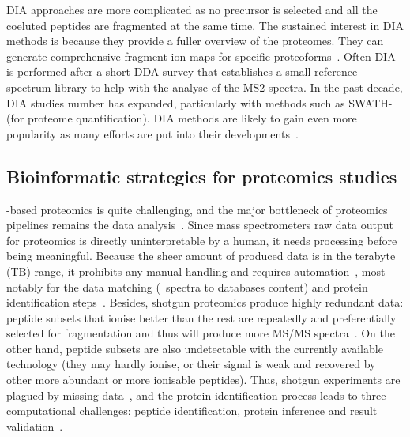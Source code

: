 \gls{DIA} approaches are more complicated
as no precursor is selected and
all the coeluted peptides are fragmented at the same time.
The sustained interest in \gls{DIA} methods is because
they provide a fuller overview of the proteomes.
They can generate comprehensive fragment-ion maps for
specific proteoforms~.
Often \gls{DIA} is performed after a short \gls{DDA} survey
that establishes a small reference spectrum library
to help with the analyse of the MS2 spectra.
In the past decade, \gls{DIA} studies number has expanded,
particularly with methods such as SWATH-\ms~
(for proteome quantification).
\gls{DIA} methods are likely to gain even more popularity
as many efforts are put into their developments~.

\subsection{Bioinformatic strategies for proteomics studies}

\ms-based proteomics is quite challenging,
and the major bottleneck of proteomics pipelines remains
the data analysis~.
Since mass spectrometers raw data output
for proteomics is directly uninterpretable by a human,
it needs processing before being meaningful.
Because the sheer amount of produced data is in the terabyte (\gls{TB}) range,
it prohibits any manual handling and requires automation~,
most notably for the data matching (\ms\ spectra to databases content) and
protein identification steps~.
Besides, shotgun proteomics produce highly redundant data:
peptide subsets that ionise better than the rest
are repeatedly and preferentially selected for fragmentation
and thus will produce more \gls{MS/MS} spectra~.
On the other hand,
peptide subsets are also undetectable with the currently available technology
(they may hardly ionise, or their signal is weak and recovered
by other more abundant or more ionisable peptides).
Thus, shotgun experiments are plagued by missing data~,
and the protein identification process leads to three computational challenges:
peptide identification, protein inference and result validation~.

